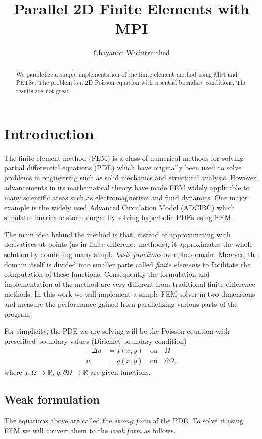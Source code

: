 \documentclass[12pt,notitlepage]{extreport}
\author{Chayanon Wichitrnithed}
\title{Parallel 2D Finite Elements with MPI}
\begin{document}
\maketitle

\begin{abstract}
  We parallelize a simple implementation of the finite element method using MPI and PETSc. The problem is a 2D Poisson equation with essential boundary conditions. The results are not great.
\end{abstract}
\section*{Introduction}
The finite element method (FEM) is a class of numerical methods for solving partial differential equations (PDE) which have originally been used to solve problems in engineering such as solid mechanics and structural analysis. However, advancements in its mathematical theory have made FEM widely applicable to many scientific areas such as electromagnetism and fluid dynamics. One major example is the widely used Advanced Circulation Model (ADCIRC) which simulates hurricane storm surges by solving hyperbolic PDEs using FEM.

The main idea behind the method is that, instead of approximating with derivatives at points (as in finite difference methods), it approximates the whole solution by combining many simple \textit{basis functions} over the domain. Morever, the domain itself is divided into smaller parts called \textit{finite elements} to facilitate the computation of these functions. Consequently the formulation and implementation of the method are very different from traditional finite difference methods. In this work we will implement a simple FEM solver in two dimensions and measure the performance gained from parallelizing various parts of the program.

For simplicity, the PDE we are solving will be the Poisson equation with prescribed boundary values (Dirichlet boundary condition)
\begin{align}
  - \Delta u &= f(x,y) \quad \text{on} \quad \Omega \\
  u &= g(x,y) \quad \text{on} \quad \partial \Omega,
\end{align}
where $f : \Omega \rightarrow \mathbb{R}$, $g: \partial\Omega \rightarrow \mathbb{R}$ are given functions.

\subsection*{Weak formulation}
The equations above are called the \textit{strong form} of the PDE. To solve it using FEM we will convert them to the \textit{weak form} as follows.
\end{document}
